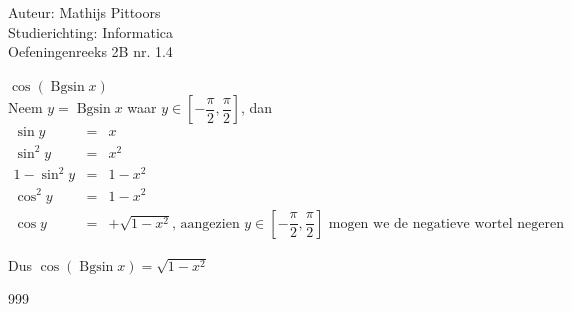 \documentclass[a4paper]{article}
\newcommand{\Bgsin}{\operatorname{Bgsin}}
\begin{document}
\noindent \large Auteur: Mathijs Pittoors \\
\noindent \large Studierichting: Informatica\\
\noindent \large Oefeningenreeks 2B nr. 1.4\\

\medskip

\normalsize

$\cos (\Bgsin x)$\\

Neem $y = \Bgsin x$ waar $y \in \left[-\dfrac{\pi}{2},\dfrac{\pi}{2}\right]$, dan\\

\begin{eqnarray*}
    \sin y &=& x\\
    \sin^2 y &=& x^2\\
    1 - \sin^2 y &=& 1 - x^2\\
    \cos^2 y &=& 1 - x^2\\
    \cos y &=& + \sqrt{1-x^2} \text{, aangezien } y \in \left[-\dfrac{\pi}{2},\dfrac{\pi}{2}\right] \text{ mogen we de negatieve wortel negeren}
\end{eqnarray*}

Dus $\cos(\Bgsin x) = \sqrt{1-x^2}$

\begin{thebibliography}{999}
\end{thebibliography}
\end{document}
